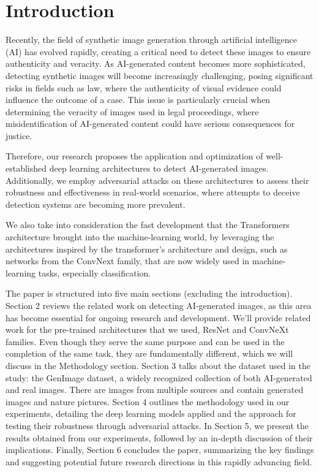 \documentclass[runningheads]{llncs}
\begin{document}
\section{Introduction}

Recently, the field of synthetic image generation through artificial intelligence (AI) has evolved rapidly, creating a critical need to detect these images to ensure authenticity and veracity. As AI-generated content becomes more sophisticated, detecting synthetic images will become increasingly challenging, posing significant risks in fields such as law, where the authenticity of visual evidence could influence the outcome of a case. This issue is particularly crucial when determining the veracity of images used in legal proceedings, where misidentification of AI-generated content could have serious consequences for justice.

Therefore, our research proposes the application and optimization of well-established deep learning architectures to detect AI-generated images. Additionally, we employ adversarial attacks on these architectures to assess their robustness and effectiveness in real-world scenarios, where attempts to deceive detection systems are becoming more prevalent. 

We also take into consideration the fast development that the Transformers architecture brought into the machine-learning world, by leveraging the architectures inspired by the transformer's architecture and design, such as networks from the ConvNext family, that are now widely used in machine-learning tasks, especially classification. 

The paper is structured into five main sections (excluding the introduction). Section 2 reviews the related work on detecting AI-generated images, as this area has become essential for ongoing research and development. We'll provide related work for the pre-trained architectures that we used, ResNet and ConvNeXt families. Even though they serve the same purpose and can be used in the completion of the same task, they are fundamentally different, which we will discuss in the Methodology section. Section 3 talks about the dataset used in the study: the GenImage dataset, a widely recognized collection of both AI-generated and real images. There are images from multiple sources and contain generated images and nature pictures.  Section 4 outlines the methodology used in our experiments, detailing the deep learning models applied and the approach for testing their robustness through adversarial attacks. In Section 5, we present the results obtained from our experiments, followed by an in-depth discussion of their implications. Finally, Section 6 concludes the paper, summarizing the key findings and suggesting potential future research directions in this rapidly advancing field.
\end{document}
